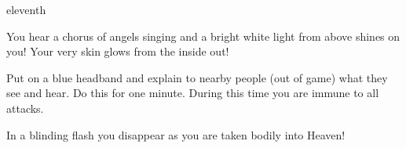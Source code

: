 \documentclass[greennotebook]{guildcamp4} %
\begin{document}
\begin{page}{eleventh}

You hear a chorus of angels singing and a bright white light from above shines on you! Your very skin glows from the inside out!

Put on a blue headband and explain to nearby people (out of game) what they see and hear. Do this for one minute. During this time you are immune to all attacks.

In a blinding flash you disappear as you are taken bodily into Heaven!

\end{page}

\endnotebook
\end{document}
